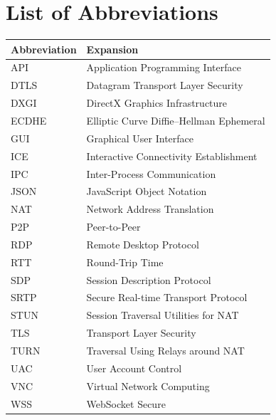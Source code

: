 \chapter*{List of Abbreviations}
\thispagestyle{plain}

\begin{longtable}{@{}p{3.2cm}p{10.5cm}@{}}
\toprule
\textbf{Abbreviation} & \textbf{Expansion} \\
\midrule
\endhead
API    & Application Programming Interface \\
DTLS   & Datagram Transport Layer Security \\
DXGI   & DirectX Graphics Infrastructure \\
ECDHE  & Elliptic Curve Diffie--Hellman Ephemeral \\
GUI    & Graphical User Interface \\
ICE    & Interactive Connectivity Establishment \\
IPC    & Inter-Process Communication \\
JSON   & JavaScript Object Notation \\
NAT    & Network Address Translation \\
P2P    & Peer-to-Peer \\
RDP    & Remote Desktop Protocol \\
RTT    & Round-Trip Time \\
SDP    & Session Description Protocol \\
SRTP   & Secure Real-time Transport Protocol \\
STUN   & Session Traversal Utilities for NAT \\
TLS    & Transport Layer Security \\
TURN   & Traversal Using Relays around NAT \\
UAC    & User Account Control \\
VNC    & Virtual Network Computing \\
WSS    & WebSocket Secure \\
\bottomrule
\end{longtable}

\clearpage
